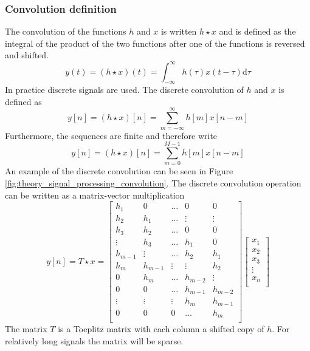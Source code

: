 \subsubsection{Convolution definition}
The convolution of the functions $h$ and $x$ is written $h \star x$ and is defined as the integral of the product of the two functions after one of the functions is reversed and shifted.
\begin{equation}
 y(t) = (h \star x)(t) = \int_{-\infty}^{\infty} h(\tau)x(t-\tau) \mathrm{d}\tau
\end{equation}
In practice discrete signals are used. The discrete convolution of $h$ and $x$ is defined as
\begin{equation}
 y [n] = (h \star x )[n] = \sum_{m=-\infty}^{\infty} h[m] x[n-m]
\end{equation}
Furthermore, the sequences are finite and therefore write
\begin{equation}\label{eq:theory_signal_processing_convolution_fir}
 y [n] = (h \star x )[n] = \sum_{m=0}^{M-1} h[m] x[n-m]
\end{equation}
An example of the discrete convolution can be seen in Figure \ref{fig:theory_signal_processing_convolution}.
The discrete convolution operation can be written as a matrix-vector multiplication
\begin{equation}\label{eq:theory_signal_processing_convolution_toeplitz}
 y [n] = T \star x =
 \begin{bmatrix}
 h_1 & 0 & \hdots & 0 & 0 \\
 h_2 & h_1 & \hdots & \vdots & \vdots \\
 h_3 & h_2 & \hdots & 0 & 0 \\
 \vdots & h_3 & \hdots & h_1 & 0 \\
 h_{m-1} & \vdots & \hdots & h_2 & h_1 \\
 h_m & h_{m-1} & \vdots & \vdots & h_2 \\
 0 & h_m & \hdots & h_{m-2} & \vdots \\
 0 & 0 & \hdots & h_{m-1} & h_{m-2} \\
 \vdots & \vdots & \vdots & h_{m} & h_{m-1} \\
 0 & 0 & 0 & \hdots & h_{m} \\
 \end{bmatrix}
 \begin{bmatrix}
  x_1 \\
  x_2 \\
  x_3 \\
  \vdots \\
  x_n \\
 \end{bmatrix}
\end{equation}
The matrix $T$ is a Toeplitz matrix with each column a shifted copy of $h$.
For relatively long signals the matrix will be sparse.

